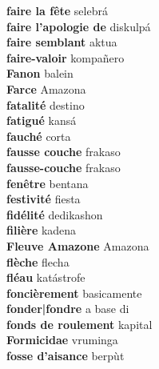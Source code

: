\textbf{ faire la fête  } selebrá \\
\textbf{ faire l’apologie de  } diskulpá \\
\textbf{ faire semblant  } aktua \\
\textbf{ faire-valoir  } kompañero \\
\textbf{ Fanon  } balein \\
\textbf{ Farce  } Amazona \\
\textbf{ fatalité  } destino \\
\textbf{ fatigué  } kansá \\
\textbf{ fauché  } corta \\
\textbf{ fausse couche  } frakaso \\
\textbf{ fausse-couche  } frakaso \\
\textbf{ fenêtre  } bentana \\
\textbf{ festivité  } fiesta \\
\textbf{ fidélité  } dedikashon \\
\textbf{ filière  } kadena \\
\textbf{ Fleuve Amazone  } Amazona \\
\textbf{ flèche  } flecha \\
\textbf{ fléau  } katástrofe \\
\textbf{ foncièrement  } basicamente \\
\textbf{ fonder|fondre  } a base di \\
\textbf{ fonds de roulement  } kapital \\
\textbf{ Formicidae  } vruminga \\
\textbf{ fosse d’aisance  } berpùt \\
